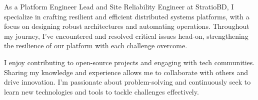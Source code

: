

\begin{cvparagraph}

As a Platform Engineer Lead and Site Reliability Engineer at StratioBD, I specialize in crafting resilient and efficient distributed systems platforms, with a focus on designing robust architectures and automating operations. Throughout my journey, I've encountered and resolved critical issues head-on, strengthening the resilience of our platform with each challenge overcome.

I enjoy contributing to open-source projects and engaging with tech communities. Sharing my knowledge and experience allows me to collaborate with others and drive innovation. I'm passionate about problem-solving and continuously seek to learn new technologies and tools to tackle challenges effectively.
\end{cvparagraph}

